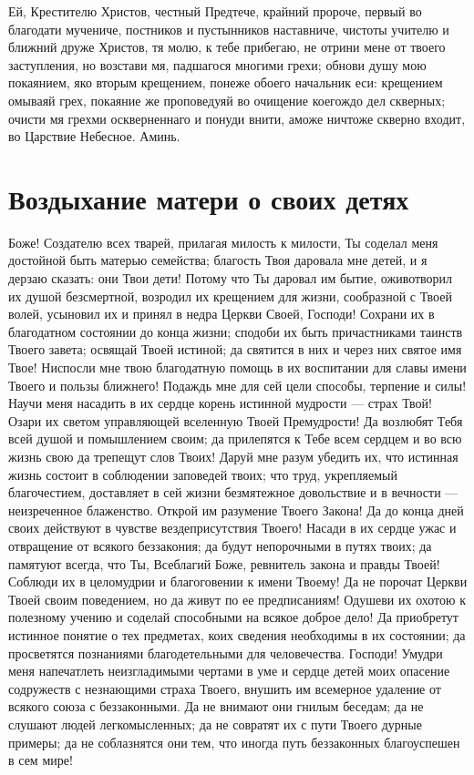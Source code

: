 Ей, Крестителю Христов, честный Предтече, крайний пророче, первый во благодати мучениче, постников и пустынников наставниче, чистоты учителю и ближний друже Христов, тя молю, к тебе прибегаю, не отрини мене от твоего заступления, но возстави мя, падшагося многими грехи; обнови душу мою покаянием, яко вторым крещением, понеже обоего начальник еси: крещением омываяй грех, покаяние же проповедуяй во очищение коегождо дел скверных; очисти мя грехми оскверненнаго и понуди внити, аможе ничтоже скверно входит, во Царствие Небесное. Аминь.

\section{Воздыхание матери о своих детях}
 


Боже! Создателю всех тварей, прилагая милость к милости, Ты соделал меня достойной быть матерью семейства; благость Твоя даровала мне детей, и я дерзаю сказать: они Твои дети! Потому что Ты даровал им бытие, оживотворил их душой безсмертной, возродил их крещением для жизни, сообразной с Твоей волей, усыновил их и принял в недра Церкви Своей, Господи! Сохрани их в благодатном состоянии до конца жизни; сподоби их быть причастниками таинств Твоего завета; освящай Твоей истиной; да святится в них и через них святое имя Твое! Ниспосли мне твою благодатную помощь в их воспитании для славы имени Твоего и пользы ближнего! Подаждь мне для сей цели способы, терпение и силы! Научи меня насадить в их сердце корень истинной мудрости — страх Твой! Озари их светом управляющей вселенную Твоей Премудрости! Да возлюбят Тебя всей душой и помышлением своим; да прилепятся к Тебе всем сердцем и во всю жизнь свою да трепещут слов Твоих! Даруй мне разум убедить их, что истинная жизнь состоит в соблюдении заповедей твоих; что труд, укрепляемый благочестием, доставляет в сей жизни безмятежное довольствие и в вечности — неизреченное блаженство. Открой им разумение Твоего Закона! Да до конца дней своих действуют в чувстве вездеприсутствия Твоего! Насади в их сердце ужас и отвращение от всякого беззакония; да будут непорочными в путях твоих; да памятуют всегда, что Ты, Всеблагий Боже, ревнитель закона и правды Твоей! Соблюди их в целомудрии и благоговении к имени Твоему! Да не порочат Церкви Твоей своим поведением, но да живут по ее предписаниям! Одушеви их охотою к полезному учению и соделай способными на всякое доброе дело! Да приобретут истинное понятие о тех предметах, коих сведения необходимы в их состоянии; да просветятся познаниями благодетельными для человечества. Господи! Умудри меня напечатлеть неизгладимыми чертами в уме и сердце детей моих опасение содружеств с незнающими страха Твоего, внушить им всемерное удаление от всякого союза с беззаконными. Да не внимают они гнилым беседам; да не слушают людей легкомысленных; да не совратят их с пути Твоего дурные примеры; да не соблазнятся они тем, что иногда путь беззаконных благоуспешен в сем мире!


